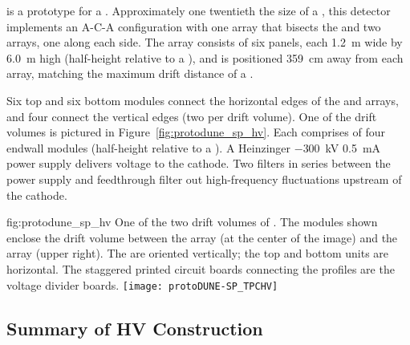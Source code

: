  \cite{Abi:2017aow} is a prototype for a . %
Approximately one twentieth the size of a , this detector implements an A-C-A configuration with one  array that bisects the  and two  arrays, one along each side. 
The  array consists of %
six  panels, each \SI{1.2}{m} wide by \SI{6.0}{m} high (half-height relative to a ), 
and is positioned \SI{359}{cm} away from each  array, matching the maximum drift distance of a .

Six top and six bottom  modules connect the horizontal edges of the  and  arrays, and four %
 connect the vertical edges (two per drift volume). One of the drift volumes is pictured in Figure~\ref{fig:protodune_sp_hv}. 
Each  comprises of four endwall modules (half-height relative to a ).
A Heinzinger $-$\SI{300}{kV} \SI{0.5}{mA}  power supply delivers voltage to the cathode.
Two  filters in series between the power supply and  feedthrough filter out high-frequency fluctuations upstream of the cathode.

\begin{dunefigure}
{fig:protodune_sp_hv}
{One of the two drift volumes of . The  modules shown enclose the drift volume between the  array (at the center of the image) and the  array (upper right). The  are oriented vertically; the top and bottom units are horizontal. The staggered printed circuit boards connecting the  profiles are the voltage divider boards. %
}
\texttt{[image: protoDUNE-SP\_TPCHV]}
\end{dunefigure}

\subsection{Summary of HV Construction}
\label{sec:fdsp-hv-protodune-summary}

